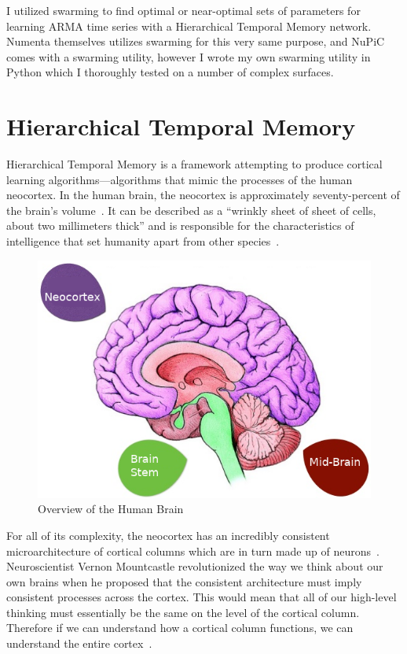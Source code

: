 \documentclass[oneside,12pt,openany]{book}
\begin{document}
	I utilized swarming to find optimal or near-optimal sets of parameters for learning ARMA time series with a Hierarchical Temporal Memory network. Numenta themselves utilizes swarming for this very same purpose, and NuPiC comes with a swarming utility, however I wrote my own swarming utility in Python which I thoroughly tested on a number of complex surfaces.
	
	\section{Hierarchical Temporal Memory}
	
	Hierarchical Temporal Memory is a framework attempting to produce cortical learning algorithms---algorithms that mimic the processes of the human neocortex. In the human brain, the neocortex is approximately seventy-percent of the brain's volume~\cite{DiscoveriesBrainWorks}. It can be described as a ``wrinkly sheet of sheet of cells, about two millimeters thick'' and is responsible for the characteristics of intelligence that set humanity apart from other species~\cite{DiscoveriesBrainWorks}. 
	
	\begin{figure}[hbt!]
		\centering
		\includegraphics[width=.5\linewidth]{images/Brain.png}
		\caption{Overview of the Human Brain}
		\label{fig:brain}
	\end{figure}
	
	For all of its complexity, the neocortex has an incredibly consistent microarchitecture of cortical columns which are in turn made up of neurons~\cite{DiscoveriesBrainWorks}. Neuroscientist Vernon Mountcastle revolutionized the way we think about our own brains when he proposed that the consistent architecture must imply consistent processes across the cortex. This would mean that all of our high-level thinking must essentially be the same on the level of the cortical column. Therefore if we can understand how a cortical column functions, we can understand the entire cortex~\cite{DiscoveriesBrainWorks}.	
	
\end{document}
